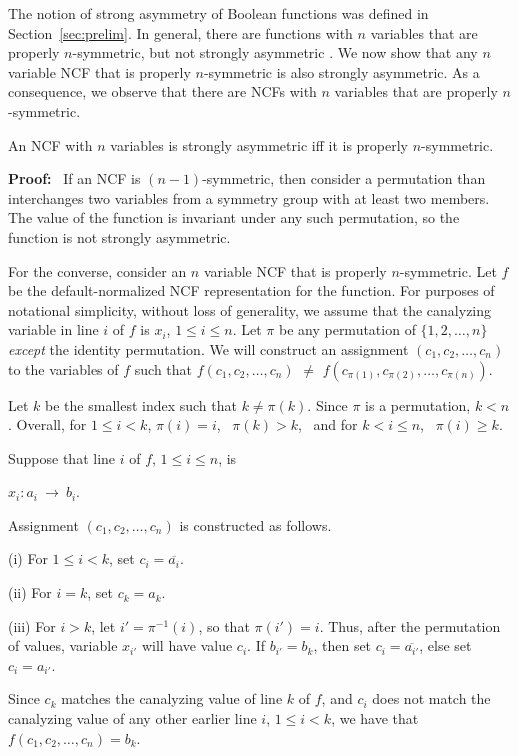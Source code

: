 The notion of strong asymmetry of Boolean functions was defined 
in Section~\ref{sec:prelim}.
In general, there are functions with $n$ variables that are properly
$n$-symmetric, but not strongly asymmetric \cite{KS-2000}.
We now show that any $n$ variable NCF that is properly $n$-symmetric
is also strongly asymmetric.
As a consequence, we observe that there are NCFs with $n$ variables
that are properly $n$-symmetric.

\begin{theorem}\label{thm:ncf_strong_asymmetry}
An NCF with $n$ variables is strongly asymmetric iff
it is properly $n$-symmetric.
\end{theorem}

\noindent
\textbf{Proof:}~ 
If an NCF is $(n-1)$-symmetric, then consider a permutation than
interchanges two variables from a symmetry group with at least two
members.  The value of the function is invariant under any such
permutation, so the function is not strongly asymmetric.

For the converse, consider an $n$ variable NCF that is properly $n$-symmetric.
Let $f$ be the default-normalized NCF representation for the function.  For
purposes of notational simplicity, without loss of generality,
we assume that the canalyzing
variable in line $i$ of $f$ is $x_i$, $1 \leq i \leq n$.  Let $\pi$
be any permutation of $\{1, 2, \ldots, n\}$ \emph{except} the
identity permutation.  We will construct an assignment $(c_1, c_2,
\ldots,  c_n)$ to the variables of $f$ such that $f(c_1, c_2, \ldots,
c_n)$ $\neq$ $f(c_{\pi(1)}, c_{\pi(2)}, \ldots, c_{\pi(n)})$.

Let $k$ be the smallest index such that $k \neq \pi(k)$.  Since
$\pi$ is a permutation, $k < n$.  Overall, for $1 \leq i < k$,
$\pi(i) = i$,~ $\pi(k) > k$,~ and for $k < i \leq n$,~ $\pi(i) \geq k$.

Suppose that line $i$ of $f$, $1 \leq i \leq n$, is 

\smallskip

\hspace*{1in} $x_i : a_i ~\longrightarrow~ b_i$. 

\smallskip

\noindent
Assignment $(c_1, c_2, \ldots,  c_n)$ is constructed as follows.
\begin{description}
\item{(i)} For $1 \leq i < k$, set $c_i = \overline{a_i}$.  
\item{(ii)} For $i = k$, set $c_k =a_k$. 
\item{(iii)} For $i > k$, let $i' = \pi^{-1}(i)$, so that $\pi(i')
= i$.  Thus, after the permutation of values, variable $x_{i'}$
will have value $c_i$.  If $b_{i'} = b_k$, then set $c_i =
\overline{a_{i'}}$, else set $c_i =  a_{i'}$.
\end{description}
Since $c_k$ matches the canalyzing value of line $k$ of $f$, and
$c_i$ does not match the canalyzing value of any other earlier line
$i$, $1 \leq i < k$, we have that $f(c_1, c_2, \ldots,  c_n) = b_k$.

